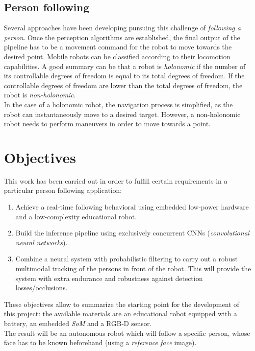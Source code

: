 \subsection{Person following}
Several approaches have been developing pursuing this challenge of \textit{following a person}. Once the perception algorithms are established, the final output of the pipeline has to be a movement command for the robot to move towards the desired point. Mobile  robots can be classified according to their locomotion capabilities. A good summary can be that a robot is \textit{holonomic} if the number of its controllable degrees of freedom is equal to its total degrees of freedom. If the controllable degrees of freedom are lower than the total degrees of freedom, the robot is \textit{non-holonomic}.\\

In the case of a holonomic robot, the navigation process is simplified, as the robot can instantaneously move to a desired target. However, a non-holonomic robot needs to perform maneuvers in order to move towards a point.\\

\section{Objectives}
\label{sec:1_objectives}
	This work has been carried out in order to fulfill certain requirements in a particular person following application:
	
	\begin{enumerate}
		\item Achieve a real-time following behavioral using embedded low-power hardware and a low-complexity educational robot.
		
		\item Build the inference pipeline using exclusively concurrent CNNs (\textit{convolutional neural networks}).
		
		\item Combine a neural system with probabilistic filtering to carry out a robust multimodal tracking of the persons in front of the robot. This will provide the system with extra endurance and robustness against detection losses/occlusions.
	\end{enumerate}
	
These objectives allow to summarize the starting point for the development of this project: the available materials are an educational robot equipped with a battery, an embedded \textit{SoM} and a RGB-D sensor.\\

The result will be an autonomous robot which will follow a specific person, whose face has to be known beforehand (using a \textit{reference face} image).
